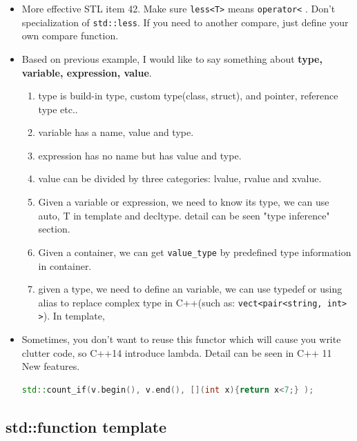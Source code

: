 \documentclass[a4paper,11pt,twoside]{book}
\begin{document}
\begin{itemize}
	\item More effective STL item 42. Make sure \texttt{less<T>} means \texttt{operator<} . Don't specialization of \texttt{std::less}. If you need to another compare, just define your own compare function.


	\item Based on previous example, I would like to say something about \textbf{type, variable, expression, value}.
\begin{enumerate}
	\item type is build-in type, custom type(class, struct), and pointer, reference type etc..
	\item variable has a name, value and type.
	\item expression has no name but has value and type.
	\item value can be divided by three categories: lvalue, rvalue and xvalue.
	\item Given a variable or expression, we need to know its type, we can use auto, T in template and decltype. detail can be seen "type inference" section.
	
	\item Given a container, we can get \texttt{value\_type} by predefined type information in container.
	
	\item given a type, we need to define an variable, we can use typedef or using alias to replace complex type in C++(such as: \texttt{vect<pair<string, int> >}). In template,

\end{enumerate}

	\item Sometimes, you don't want to reuse this functor which will cause you write clutter code, so C++14 introduce lambda.  Detail can be seen in C++ 11 New features.
\begin{lstlisting}[frame=single, language=c++]
std::count_if(v.begin(), v.end(), [](int x){return x<7;} );
\end{lstlisting}

\end{itemize}

\subsection{std::function template}
\end{document}

